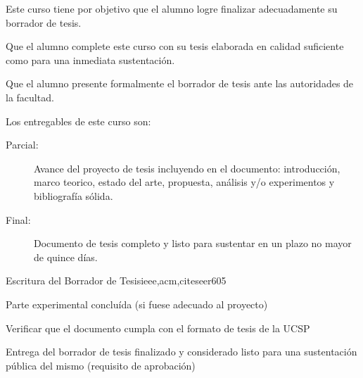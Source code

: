 \begin{syllabus}


\begin{justification}
Este curso tiene por objetivo que el alumno logre finalizar adecuadamente su borrador de tesis.
\end{justification}

\begin{goals}
\item Que el alumno complete este curso con su tesis elaborada en calidad suficiente como para una inmediata sustentación.
\item Que el alumno presente formalmente el borrador de tesis ante las autoridades de la facultad.
\item Los entregables de este curso son:
	\begin{description}
	\item [Parcial:] Avance del proyecto de tesis incluyendo en el documento: introducción, marco teorico, estado del arte, propuesta, análisis y/o experimentos y bibliografía sólida.
	\item [Final:] Documento de tesis completo y listo para sustentar en un plazo no mayor de quince días.
	\end{description}
\end{goals}

\begin{outcomes}
\end{outcomes}

\begin{unit}{Escritura del Borrador de Tesis}{ieee,acm,citeseer}{60}{5}
\begin{unitgoals}
      \item Parte experimental concluída (si fuese adecuado al proyecto)
			\item Verificar que el documento cumpla con el formato de tesis de la UCSP 
      \item Entrega del borrador de tesis finalizado y considerado listo para una sustentación pública del mismo (requisito de aprobación)
   \end{unitgoals}
\end{unit}



\begin{coursebibliography}

\end{coursebibliography}
\end{syllabus}
